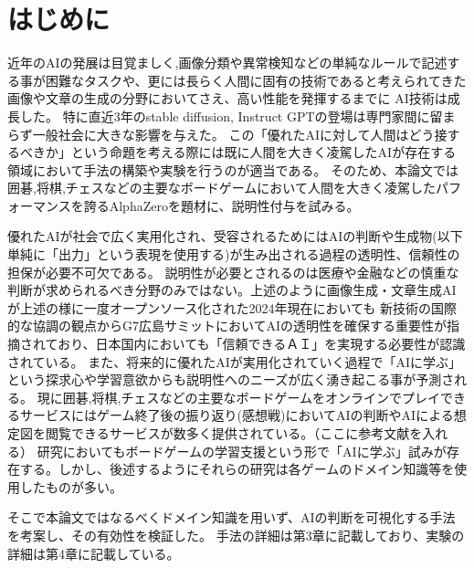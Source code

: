 \chapter{はじめに}
近年のAIの発展は目覚ましく,画像分類や異常検知などの単純なルールで記述する事が困難なタスクや、更には長らく人間に固有の技術であると考えられてきた画像や文章の生成の分野においてさえ、高い性能を発揮するまでに
AI技術は成長した。
特に直近3年のstable diffusion\cite{diffusion}, Instruct GPT\cite{GPT}の登場は専門家間に留まらず一般社会に大きな影響を与えた。
この「優れたAIに対して人間はどう接するべきか」という命題を考える際には既に人間を大きく凌駕したAIが存在する領域において手法の構築や実験を行うのが適当である。
そのため、本論文では囲碁,将棋,チェスなどの主要なボードゲームにおいて人間を大きく凌駕したパフォーマンスを誇るAlphaZero\cite{AlphaZero}を題材に、説明性付与を試みる。

優れたAIが社会で広く実用化され、受容されるためにはAIの判断や生成物(以下単純に「出力」という表現を使用する)が生み出される過程の透明性、信頼性の担保が必要不可欠である。
説明性が必要とされるのは医療や金融などの慎重な判断が求められるべき分野のみではない。上述のように画像生成・文章生成AIが上述の様に一度オープンソース化された2024年現在においても
新技術の国際的な協調の観点からG7広島サミットにおいてAIの透明性を確保する重要性が指摘されており\cite{Hiroshima}、日本国内においても「信頼できるＡＩ」を実現する必要性が認識されている\cite{グランドデザイン}。
また、将来的に優れたAIが実用化されていく過程で「AIに学ぶ」という探求心や学習意欲からも説明性へのニーズが広く湧き起こる事が予測される。
現に囲碁,将棋,チェスなどの主要なボードゲームをオンラインでプレイできるサービスにはゲーム終了後の振り返り(感想戦)においてAIの判断やAIによる想定図を閲覧できるサービスが数多く提供されている。（ここに参考文献を入れる）
研究においてもボードゲームの学習支援という形で「AIに学ぶ」試みが存在する。しかし、後述するようにそれらの研究は各ゲームのドメイン知識等を使用したものが多い。

そこで本論文ではなるべくドメイン知識を用いず、AIの判断を可視化する手法を考案し、その有効性を検証した。
手法の詳細は第3章に記載しており、実験の詳細は第4章に記載している。
